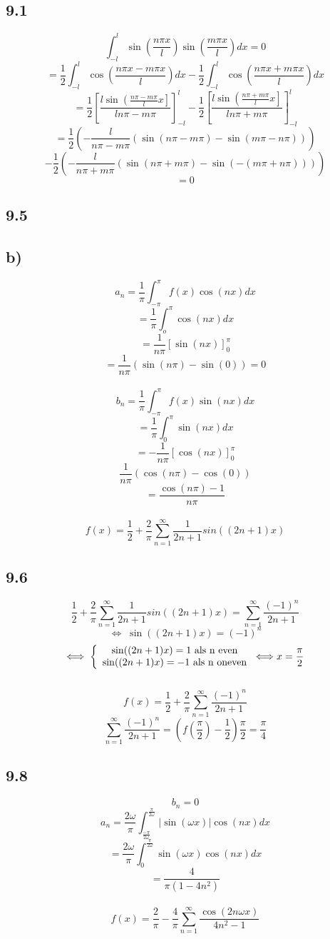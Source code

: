 \documentclass[11pt]{article}
\begin{document}
\subsection*{9.1}
\[
\int_{-l}^l\sin\left(\frac{n\pi x}{l}\right)\sin\left(\frac{m\pi x}{l}\right)dx=0
\]
\[
= \frac{1}{2}\int_{-l}^l\cos\left(\frac{n\pi x - m\pi x}{l}\right)dx - \frac{1}{2}\int_{-l}^l\cos\left(\frac{n\pi x + m\pi x}{l}\right)dx
\]
\[
= \frac{1}{2}\left[\frac{l\sin\left(\frac{n\pi-m\pi}{l}x\right]}{ln\pi-m\pi}\right]_{-l}^l
-
\frac{1}{2}\left[\frac{l\sin\left(\frac{n\pi+m\pi}{l}x\right]}{ln\pi+m\pi}\right]_{-l}^l
\]
\[
= \frac{1}{2} \left( -\frac{l}{n\pi - m\pi} \left( \sin(n\pi - m\pi)- \sin(m\pi - n\pi) \right) \right)
\]\[
-\frac{1}{2} \left( -\frac{l}{n\pi + m\pi} \left( \sin(n\pi + m\pi)- \sin(-(m\pi + n\pi)) \right) \right)
\]
\[
=0
\]

\subsection*{9.5}
\subsection*{b)}
\[
a_n = \frac{1}{\pi}\int_{-\pi}^\pi f(x)\cos(nx)dx
\]
\[
= \frac{1}{\pi} \int_o^\pi \cos(nx)dx
\]
\[
=\frac{1}{n\pi}\left[\sin(nx)\right]_0^\pi
\]
\[
= \frac{1}{n\pi}(\sin(n\pi)-\sin(0)) = 0
\]\\
\[
b_n = \frac{1}{\pi}\int_{-\pi}^\pi f(x)\sin(nx)dx
\]
\[
= \frac{1}{\pi} \int_0^\pi \sin(nx)dx
\]
\[
= -\frac{1}{n\pi} \left[ \cos(nx) \right]_0^\pi
\]
\[
\frac{1}{n\pi}(\cos(n\pi)-\cos(0))
\]
\[
= \frac{\cos(n\pi)-1}{n\pi}
\]\\
\[
f(x)  = \frac{1}{2} + \frac{2}{\pi} \sum_{n=1}^\infty \frac{1}{2n+1}sin((2n+1)x)
\]

\subsection*{9.6}
\[
\frac{1}{2} + \frac{2}{\pi} \sum_{n=1}^\infty \frac{1}{2n+1}sin((2n+1)x) = \sum_{n=1}^\infty\frac{(-1)^n}{2n+1}
\]
\[
\Longleftrightarrow\; \sin((2n+1)x) = (-1)^n
\]
\[
\Longleftrightarrow\; \left\lbrace \begin{array}{c c}
\sin((2n+1)x) = 1 \text{ als n even}\\ \sin((2n+1)x) = -1 \text{ als n oneven}
\end{array}
\right. \Longleftrightarrow x = \frac{\pi}{2}
\]\\
\[
f(x) = \frac{1}{2} + \frac{2}{\pi} \sum_{n=1}^\infty\frac{(-1)^n}{2n+1}
\]
\[
\sum_{n=1}^\infty\frac{(-1)^n}{2n+1} = (f(\frac{\pi}{2}) - \frac{1}{2})\frac{\pi}{2} = \frac{\pi}{4}
\]

\subsection*{9.8}
\[ b_n =0\]
\[ a_n = \frac{2\omega}{\pi}\int_{\frac{-\pi}{2\omega}}^{\frac{\pi}{2\omega	}} |\sin(\omega x)|\cos(nx)dx
\]
\[
=\frac{2\omega}{\pi}\int_0^{\frac{\pi}{2\omega	}} \sin(\omega x)\cos(nx)dx
\]
\[
=\frac{4}{\pi(1-4n^2)}
\]\\
\[
f(x) = \frac{2}{\pi} - \frac{4}{\pi}\sum_{n=1}^\infty\frac{\cos(2n\omega x)}{4n^2 -1}
\]
\end{document}
